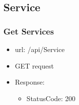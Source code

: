 \documentclass[11pt]{article}
\begin{document}
\subsection{Service}
\label{sec:org28e3437}
\subsubsection{Get Services}
\label{sec:org678e920}
\begin{itemize}
\item url: /api/Service
\item GET request
\item Response:
\begin{itemize}
\item StatusCode: 200
\end{itemize}
\end{itemize}
\end{document}

